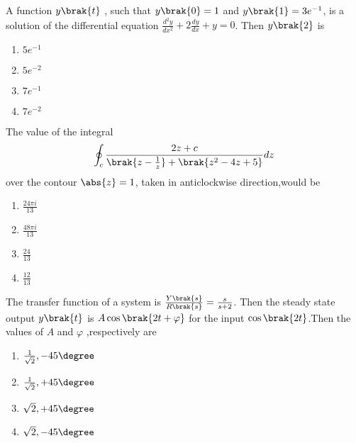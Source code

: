 \iffalse
\chapter{2016}
\author{EE24BTECH11011}
\section{ee}
\fi
   \item A function $y\brak{t}$ , such that $y\brak{0}=1$ and $y\brak{1} = 3e^{-1}$, is a solution of the differential equation $\frac{d^2 y}{dx^2} + 2\frac{dy}{dx}+y =0$. Then $y\brak{2}$ is
   \begin{multicols}{4}
       \begin{enumerate}
           \item $5e^{-1}$
           \item $5e^{-2}$
           \item $7e^{-1}$
           \item $7e^{-2}$
       \end{enumerate}
   \end{multicols}
   \item The value of the integral
   \begin{align}
       \oint_c \frac{2z+c}{\brak{z - \frac{1}{z}}+\brak{z^2 - 4z + 5}} dz
   \end{align}
   over the contour $\abs{z} = 1$, taken in anticlockwise direction,would be
   \begin{multicols}{4}
       \begin{enumerate}
           \item $\frac{24 \pi i}{13}$
           \item $\frac{48 \pi i}{13}$
           \item $\frac{24 }{13}$
           \item $\frac{12}{13}$
       \end{enumerate}
   \end{multicols}
   \item The transfer function of a system is $\frac{Y\brak{s}}{R\brak{s}} = \frac{s}{s+2}$. Then the steady state output $y\brak{t}$ is $A\cos{\brak{2t + \varphi}}$ for the input $\cos{\brak{2t}}$.Then the values of $A$ and $\varphi$ ,respectively are
   \begin{multicols}{4}
       \begin{enumerate}
           \item $\frac{1}{\sqrt{2}},-45\degree$
           \item $\frac{1}{\sqrt{2}},+45\degree$
           \item ${\sqrt{2}},+45\degree$
           \item ${\sqrt{2}},-45\degree$
       \end{enumerate}
   \end{multicols}
